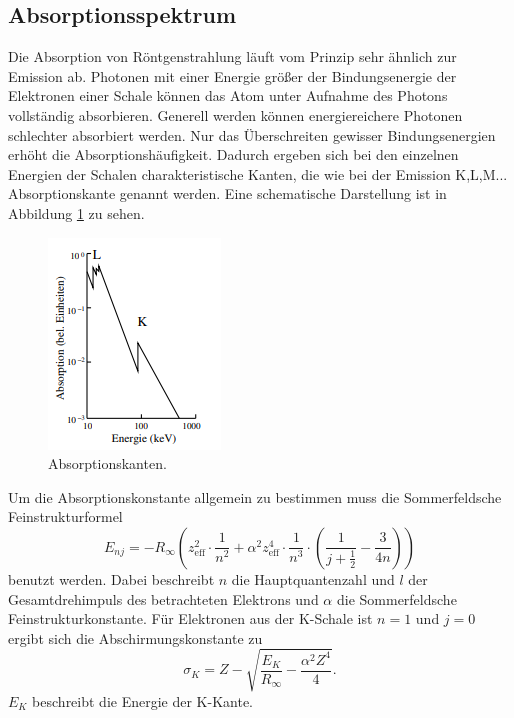 \subsection{Absorptionsspektrum}
Die Absorption von Röntgenstrahlung läuft vom Prinzip sehr ähnlich zur Emission ab. Photonen 
mit einer Energie größer der Bindungsenergie der Elektronen einer Schale können das Atom unter Aufnahme des Photons vollständig
absorbieren. Generell werden können energiereichere Photonen schlechter absorbiert werden. Nur das Überschreiten gewisser Bindungsenergien
erhöht die Absorptionshäufigkeit. Dadurch ergeben sich bei den einzelnen Energien der Schalen charakteristische Kanten, die wie bei
der Emission K,L,M... Absorptionskante genannt werden. Eine schematische Darstellung ist in 
Abbildung \ref{fig:Absorption} zu sehen.
\begin{figure}[H]
    \centering
    \includegraphics[scale=1.5]{content/Absorption.png}
    \caption{Absorptionskanten\cite{sample}.}
    \label{fig:Absorption}
\end{figure}

\noindent Um die Absorptionskonstante allgemein zu bestimmen muss die Sommerfeldsche Feinstrukturformel
\begin{equation}
    E_{nj}=-R_\infty \left(z_\text{eff}^2\cdot \frac{1}{n^2}+\alpha^2z_\text{eff}^4\cdot \frac{1}{n^3}\cdot\left(\frac{1}{j+\frac{1}{2}}-\frac{3}{4n}\right)\right)
    \label{eq:Sommerfeld}
\end{equation}
benutzt werden. Dabei beschreibt $n$ die Hauptquantenzahl und $l$ der Gesamtdrehimpuls des betrachteten Elektrons und $\alpha$ die Sommerfeldsche Feinstrukturkonstante.
Für Elektronen aus der K-Schale ist $n=1$ und $j=0$ ergibt sich die Abschirmungskonstante zu 
\begin{equation}
    \sigma_K=Z-\sqrt{\frac{E_K}{R_\infty}-\frac{\alpha^2Z^4}{4}}.
    \label{eq:Abschirm}
\end{equation} 
$E_K$ beschreibt die Energie der K-Kante.
